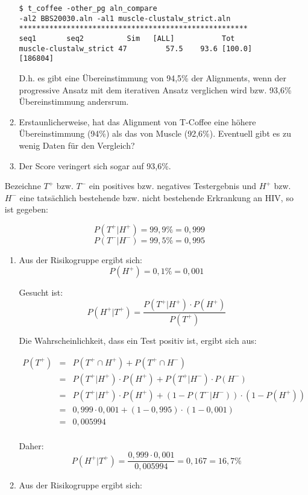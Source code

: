 \documentclass{homework}
\begin{document}
\begin{enumerate}
\begin{enumerate}
\begin{verbatim}
$ t_coffee -other_pg aln_compare 
-al2 BBS20030.aln -al1 muscle-clustalw_strict.aln 
*****************************************************
seq1       seq2          Sim   [ALL]           Tot  
muscle-clustalw_strict 47         57.5    93.6 [100.0]   [186804]
\end{verbatim}
D.h. es gibt eine Übereinstimmung von 94,5\% der Alignments, wenn der progressive Ansatz mit dem iterativen Ansatz verglichen wird bzw. 93,6\% Übereinstimmung andersrum. 

\item
Erstaunlicherweise, hat das Alignment von T-Coffee eine höhere Übereinstimmung (94\%) als das von Muscle (92,6\%). Eventuell gibt es zu wenig Daten für den Vergleich?

\item
Der Score veringert sich sogar auf 93,6\%.
\end{enumerate}



Bezeichne $T^+$ bzw. $T^-$ ein positives bzw. negatives Testergebnis und $H^+$
bzw. $H^-$ eine tatsächlich bestehende bzw. nicht bestehende Erkrankung an HIV,
so ist gegeben:

$$P(T^+ | H^+) = 99,9\% = 0,999$$
$$P(T^- | H^-) = 99,5\% = 0,995$$

\begin{enumerate}
\item Aus der Risikogruppe ergibt sich:
$$P(H^+) = 0,1\% = 0,001$$

Gesucht ist:
$$P(H^+ | T^+) = \frac{P(T^+ | H^+) \cdot P(H^+)}{P(T^+)}$$

Die Wahrscheinlichkeit, dass ein Test positiv ist, ergibt sich aus:

\begin{eqnarray*}
P(T^+)
& = & P(T^+ \cap H^+) + P(T^+ \cap H^-) \\ 
& = & P(T^+ | H^+) \cdot P(H^+) + P(T^+ | H^-) \cdot P(H^-) \\ 
& = & P(T^+ | H^+) \cdot P(H^+) + (1-P(T^- | H^-)) \cdot (1-P(H^+))\\
& = & 0,999 \cdot 0,001 + (1-0,995)\cdot(1-0,001)\\
& = & 0,005994\\
\end{eqnarray*}

Daher:
$$P(H^+ | T^+) = \frac{0,999\cdot0,001}{0,005994} = 0,167 = 16,7\%$$

\item Aus der Risikogruppe ergibt sich:


\end{enumerate}
\end{enumerate}
\end{document}
